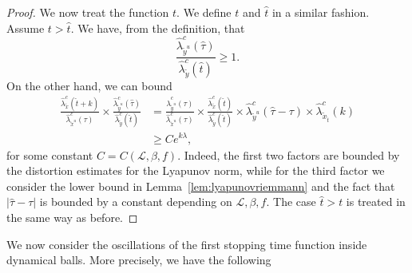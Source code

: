 \documentclass[a4paper,11pt,reqno]{amsart}
\newcommand{\cL}{{\mathcal L}}
\newcommand{\tix}{\tilde{x}}
\theoremstyle{definition}
\begin{document}
\begin{proof}
We now treat the function $t$. We define $t$ and $\hat{t}$ in a similar fashion. Assume $t>\hat{t}$. We have, from the definition, that
\[
\frac{\hat{\lambda}^c_{\tilde{y}^u}(\hat{\tau})}{\hat{\lambda}^c_{\tilde{y}}(\hat{t})}\geq 1.
\]
On the other hand, we can bound
\begin{align}
    \frac{\hat{\lambda}^c_{\tilde{x}}(\hat{t}+k)}{\hat{\lambda}^c_{\tilde{x}^u}(\tau)}\times\frac{\hat{\lambda}^c_{\tilde{y}^u}(\hat{\tau})}{\hat{\lambda}^c_{\tilde{y}}(\hat{t})}&=\frac{\hat{\lambda}^c_{\tilde{y}^u}(\tau)}{\hat{\lambda}^c_{\tilde{x}^u}(\tau)}\times\frac{\hat{\lambda}^c_{\tilde{x}}(\hat{t})}{\hat{\lambda}^c_{\tilde{y}}(\hat{t})}\times\hat{\lambda}^c_{\tilde{y}^u}(\hat{\tau}-\tau)\times\hat{\lambda}^c_{\tix_{\hat{t}}}(k)\nonumber\\
    &\geq Ce^{k\lambda}\nonumber,
\end{align}
for some constant $C=C(\cL,\beta,f)$. Indeed, the first two factors are bounded by the distortion estimates for the Lyapunov norm, while for the third factor we consider the lower bound in Lemma~\ref{lem:lyapunovriemmann} and the fact that $|\hat{\tau}-\tau|$ is bounded by a constant depending on $\cL,\beta,f$. The case $\hat{t}>t$ is treated in the same way as before.
\end{proof}

We now consider the oscillations of the first stopping time function inside dynamical balls. More precisely, we have the following
\end{document}
